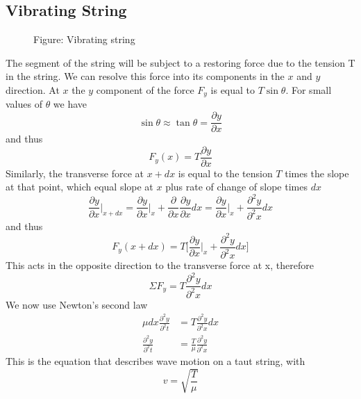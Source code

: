 \documentclass[../../../main.tex]{subfiles}
\begin{document}
\subsection{Vibrating String}
\begin{figure*}[t]
    \centering
    \caption*{Figure: Vibrating string}
\end{figure*}
The segment of the string will be subject to a restoring force due to the tension T in the string. We can resolve this force into its components in the $x$ and $y$ direction. At $x$ the $y$ component of the force $F_y$ is equal to $T \sin \theta$. For small values of $\theta$ we have
\begin{equation*}
    \sin \theta \approx \tan \theta=\frac{\partial y}{\partial x}
\end{equation*}
and thus 
\begin{equation*}
    F_y(x)= T \frac{\partial y}{\partial x}
\end{equation*}
Similarly, the transverse force at $x + dx$ is equal to the tension $T$ times the slope at that point, which equal slope at $x$ plus rate of change of slope times $dx$
\begin{equation*}
    \frac{\partial y}{\partial x}\bigg |_{x + dx} =\frac{\partial y}{\partial x}\bigg |_{x}+ \frac{\partial }{\partial x} \frac{\partial y}{\partial x} dx= \frac{\partial y}{\partial x}\bigg |_{x}+ \frac{\partial^2 y}{\partial^2 x} dx
\end{equation*}
and thus 
\begin{equation*}
    F_y(x+dx)= T \biggl[\frac{\partial y}{\partial x}\bigg |_{x}+ \frac{\partial^2 y}{\partial^2 x} dx\biggr]
\end{equation*}
This acts in the opposite direction to the transverse force at x, therefore
\begin{equation*}
    \Sigma F_y=T  \frac{\partial^2 y}{\partial^2 x} dx
\end{equation*}
We now use Newton's second law 
\begin{align*}
    \mu dx \frac{\partial^2 y}{\partial^2 t}&= T  \frac{\partial^2 y}{\partial^2 x} dx\\
    \frac{\partial^2 y}{\partial^2 t}&=\frac{T}{\mu} \frac{\partial^2 y}{\partial^2 x}
\end{align*}
This is the equation that describes wave motion on a taut string, with
\begin{equation*}
    v=\sqrt{\frac{T}{\mu}}
\end{equation*}
\end{document}
